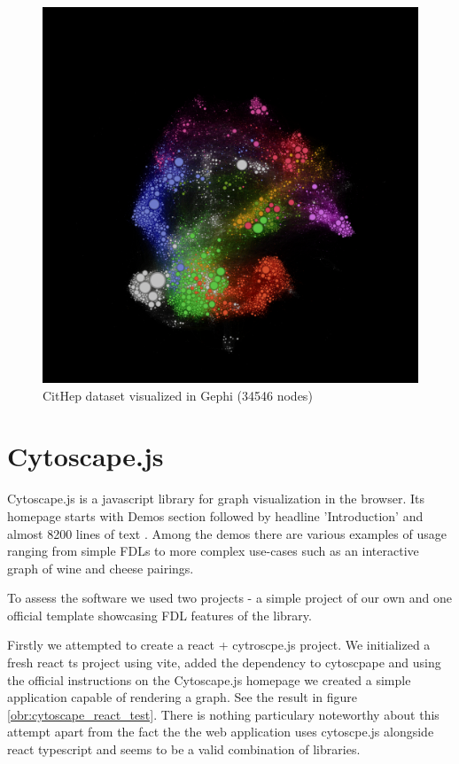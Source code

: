 \begin{figure}[p]\centering
  \includegraphics[width=140mm, keepaspectratio]{img/gephi_cithep_35k.png}
  \caption{CitHep dataset visualized in Gephi (34546 nodes)}
  \label{obr:gephi_cithep}
\end{figure}

\section{Cytoscape.js}

Cytoscape.js is a javascript library for graph visualization in the browser.
Its homepage starts with Demos section followed by headline 'Introduction' and almost 8200 lines of text \cite{cytoscapes_js_homepage}.
Among the demos there are various examples of usage ranging from simple \glspl{FDL} to more complex use-cases such as an interactive graph of wine and cheese pairings.
\cite{wine_and_cheese}

To assess the software we used two projects - a simple project of our own and one official template showcasing \gls{FDL} features of the library.

Firstly we attempted to create a react + cytroscpe.js project.
We initialized a fresh react ts project using \gls{vite}, added the dependency to cytoscpape and using the official instructions on the Cytoscape.js homepage we
created a simple application capable of rendering a graph.
See the result in figure \ref{obr:cytoscape_react_test}.
There is nothing particulary noteworthy about this attempt apart from the fact the the web application uses cytoscpe.js alongside react typescript
and seems to be a valid combination of libraries.


